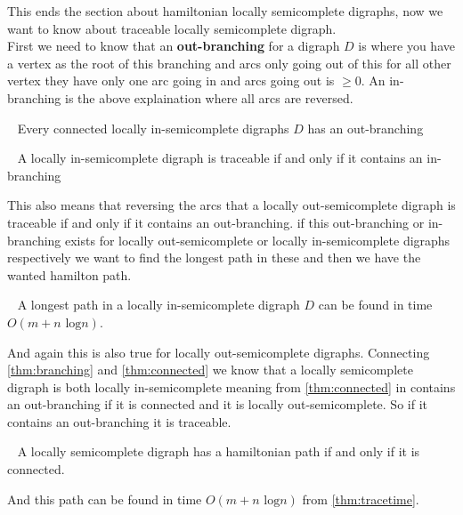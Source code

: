 This ends the section about hamiltonian locally semicomplete digraphs, now we want to know about traceable locally semicomplete digraph. \\
First we need to know that an \textbf{out-branching} for a digraph $D$ is where you have a vertex as the root of this branching and arcs only going out of this for all other vertex they have only one arc going in and arcs going out is $\geq 0$. 
An in-branching is the above explaination where all arcs are reversed.
\begin{lemma}~\cite{banggutin}
    Every connected locally in-semicomplete digraphs $D$ has an out-branching
    \label{thm:connected}
\end{lemma}
\begin{thm}~\cite{bangJCT59}
    A locally in-semicomplete digraph is traceable if and only if it contains an in-branching
    \label{thm:branching}
\end{thm}
This also means that reversing the arcs that a locally out-semicomplete digraph is traceable if and only if it contains an out-branching. 
if this out-branching or in-branching exists for locally out-semicomplete or locally in-semicomplete digraphs respectively we want to find the longest path in these and then we have the wanted hamilton path.
\begin{thm}~\cite{bangDM41}
    A longest path in a locally in-semicomplete digraph $D$ can be found in time $O(m+n\text{ log}n)$. 
    \label{thm:tracetime}
\end{thm}
And again this is also true for locally out-semicomplete digraphs.
Connecting \autoref{thm:branching} and \autoref{thm:connected} we know that a locally semicomplete digraph is both locally in-semicomplete meaning from \autoref{thm:connected} in contains an out-branching if it is connected and it is locally out-semicomplete. So if it contains an out-branching it is traceable. 
\begin{thm}~\cite{bangJGT14}
    A locally semicomplete digraph has a hamiltonian path if and only if it is connected.
\end{thm}
And this path can be found in time $O(m+n\text{ log}n)$ from \autoref{thm:tracetime}.


